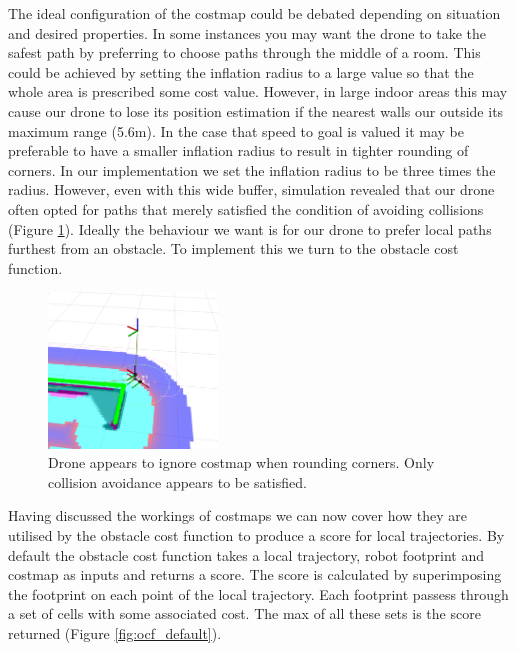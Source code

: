\documentclass[capstone_report.tex]{subfiles}
\begin{document}
The ideal configuration of the costmap could be debated depending on situation and desired properties.  In some instances you may want the drone to take the safest path by preferring to choose paths through the middle of a room.  This could be achieved by setting the inflation radius to a large value so that the whole area is prescribed some cost value.  However, in large indoor areas this may cause our drone to lose its position estimation if the nearest walls our outside its maximum range (5.6m).  In the case that speed to goal is valued it may be preferable to have a smaller inflation radius to result in tighter rounding of corners.  In our implementation we set the inflation radius to be three times the radius.  However, even with this wide buffer, simulation revealed that our drone often opted for paths that merely satisfied the condition of avoiding collisions (Figure \ref{fig:tight_rounding}).  Ideally the behaviour we want is for our drone to prefer local paths furthest from an obstacle.  To implement this we turn to the obstacle cost function.

\begin{figure}[H]
    \centering
    \includegraphics[width=0.4\textwidth]{imgs/does_not_obey_costmap.png}
    \caption{Drone appears to ignore costmap when rounding corners.  Only collision avoidance appears to be satisfied.}\label{fig:tight_rounding}
\end{figure}

Having discussed the workings of costmaps we can now cover how they are utilised by the obstacle cost function to produce a score for local trajectories.  By default the obstacle cost function takes a local trajectory, robot footprint and costmap as inputs and returns a score.  The score is calculated by superimposing the footprint on each point of the local trajectory.  Each footprint passess through a set of cells with some associated cost.  The max of all these sets is the score returned (Figure \ref{fig:ocf_default}). \\
\end{document}
